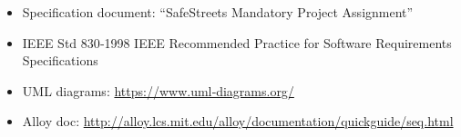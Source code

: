 \begin{itemize}
    \item Specification document: “SafeStreets Mandatory Project Assignment”
    \item IEEE Std 830‐1998 IEEE Recommended Practice for Software Requirements Specifications
    \item UML diagrams: \url{https://www.uml‐diagrams.org/}
    \item Alloy doc: \url{http://alloy.lcs.mit.edu/alloy/documentation/quickguide/seq.html}
\end{itemize}